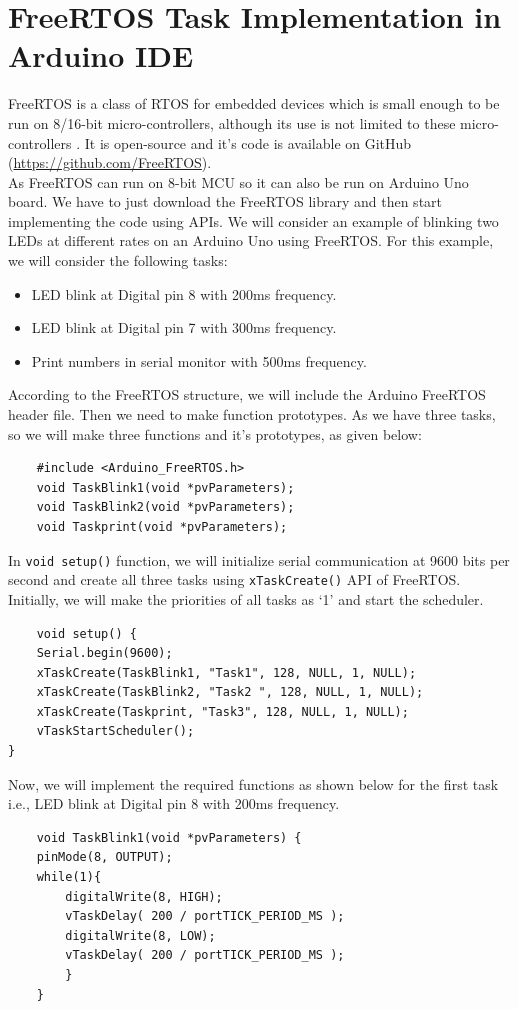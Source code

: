 \documentclass[12pt]{report}
\begin{document}
\section{FreeRTOS Task Implementation in Arduino IDE}
FreeRTOS is a class of RTOS for embedded devices which is small enough to be run on 8/16-bit micro-controllers, although its use is not limited to these micro-controllers \cite{freertos}. It is open-source and it's code is available on GitHub (\url{https://github.com/FreeRTOS}).\\

As FreeRTOS can run on 8-bit MCU so it can also be run on Arduino Uno board. We have to just download the FreeRTOS library and then start implementing the code using APIs. We will consider an example of blinking two LEDs at different rates on an Arduino Uno using FreeRTOS. For this example, we will consider the following tasks:
\begin{itemize}
    \setlength\itemsep{-0.2em}
    \item LED blink at Digital pin 8 with 200ms frequency.
    \item LED blink at Digital pin 7 with 300ms frequency.
    \item Print numbers in serial monitor with 500ms frequency. 
\end{itemize}

According to the FreeRTOS structure, we will include the Arduino FreeRTOS header file. Then we need to make function prototypes. As we have three tasks, so we will make three functions and it's prototypes, as given below:
\begin{verbatim}
    #include <Arduino_FreeRTOS.h>
    void TaskBlink1(void *pvParameters);
    void TaskBlink2(void *pvParameters);
    void Taskprint(void *pvParameters);
\end{verbatim}

In \texttt{void setup()} function, we will initialize serial communication at 9600 bits per second and create all three tasks using \texttt{xTaskCreate()} API of FreeRTOS. Initially, we will make the priorities of all tasks as ‘1’ and start the scheduler.
\begin{verbatim}
    void setup() {
    Serial.begin(9600);
    xTaskCreate(TaskBlink1, "Task1", 128, NULL, 1, NULL);
    xTaskCreate(TaskBlink2, "Task2 ", 128, NULL, 1, NULL);
    xTaskCreate(Taskprint, "Task3", 128, NULL, 1, NULL);   
    vTaskStartScheduler();
}
\end{verbatim}

Now, we will implement the required functions as shown below for the first task i.e., LED blink at Digital pin 8 with 200ms frequency. 
\begin{verbatim}
    void TaskBlink1(void *pvParameters) {
    pinMode(8, OUTPUT);
    while(1){
        digitalWrite(8, HIGH);   
        vTaskDelay( 200 / portTICK_PERIOD_MS ); 
        digitalWrite(8, LOW);    
        vTaskDelay( 200 / portTICK_PERIOD_MS ); 
    	}
    }
\end{verbatim}
\end{document}
